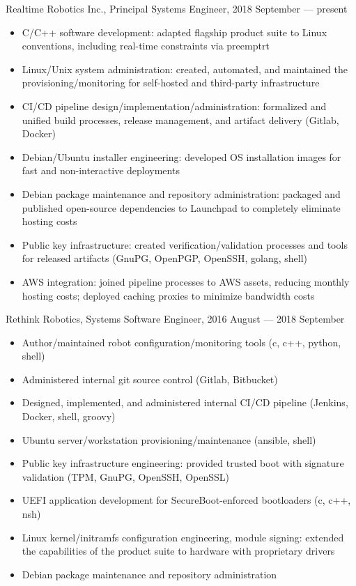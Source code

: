 \documentclass[letterpaper,11pt]{article}
\begin{document}
Realtime Robotics Inc., Principal Systems Engineer, 2018 September --- present

\begin{itemize}
\item C/C++ software development: adapted flagship product suite to Linux
  conventions, including real-time constraints via preemptrt
\item Linux/Unix system administration: created, automated, and maintained the
  provisioning/monitoring for self-hosted and third-party infrastructure
\item CI/CD pipeline design/implementation/administration: formalized and
  unified build processes, release management, and artifact delivery (Gitlab,
  Docker)
\item Debian/Ubuntu installer engineering: developed OS installation images for
  fast and non-interactive deployments
\item Debian package maintenance and repository administration: packaged and
  published open-source dependencies to Launchpad to completely eliminate
  hosting costs
\item Public key infrastructure: created verification/validation processes and
  tools for released artifacts (GnuPG, OpenPGP, OpenSSH, golang, shell)
\item AWS integration: joined pipeline processes to AWS assets, reducing
  monthly hosting costs; deployed caching proxies to minimize bandwidth costs
\end{itemize}

Rethink Robotics, Systems Software Engineer, 2016 August --- 2018 September

\begin{itemize}
\item Author/maintained robot configuration/monitoring tools (c, c++, python,
  shell)
\item Administered internal git source control (Gitlab, Bitbucket)
\item Designed, implemented, and administered internal CI/CD pipeline (Jenkins,
  Docker, shell, groovy)
\item Ubuntu server/workstation provisioning/maintenance (ansible, shell)
\item Public key infrastructure engineering: provided trusted boot with
  signature validation (TPM, GnuPG, OpenSSH, OpenSSL)
\item UEFI application development for SecureBoot-enforced bootloaders (c, c++,
  nsh)
\item Linux kernel/initramfs configuration engineering, module signing:
  extended the capabilities of the product suite to hardware with proprietary
  drivers
\item Debian package maintenance and repository administration
\end{itemize}
\end{document}
